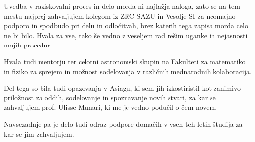 Uvedba v raziskovalni proces in delo morda ni najlažja naloga, zato se na tem mestu najprej zahvaljujem kolegom iz ZRC-SAZU in Vesolje-SI za neomajno podporo in spodbudo pri delu in odločitvah, brez katerih tega zapisa morda celo ne bi bilo. Hvala za vse, tako še vedno z veseljem rad rešim uganke in nejasnosti mojih procedur. 

Hvala tudi mentorju ter celotni astronomski skupin na Fakulteti za matematiko in fiziko za sprejem in možnost sodelovanja v različnih mednarodnih kolaboracija. 

Del tega so bila tudi opazovanja v Asiagu, ki sem jih izkostiristil kot zanimivo priložnost za oddih, sodelovanje in spoznavanje novih stvari, za kar se zahvaljujem prof. Ulisse Munari, ki me je vedno podučil o čem novem.

Navsezadnje pa je delo tudi odraz podpore domačih v vseh teh letih študija za kar se jim zahvaljujem.